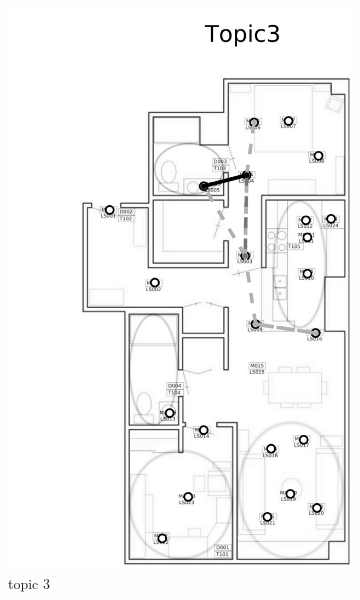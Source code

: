 \documentclass{article}
\begin{document}
\begin{figure}[!t]
\begin{subfigure}{0.32\linewidth}
    \includegraphics[width=\linewidth]{figures/adl_tm/topic3_bw_cp}
    \caption{topic 3}
    \label{fig:adl_tm-3}
\end{subfigure}
\begin{subfigure}{0.32\linewidth}

\end{subfigure}
\end{figure}
\end{document}
